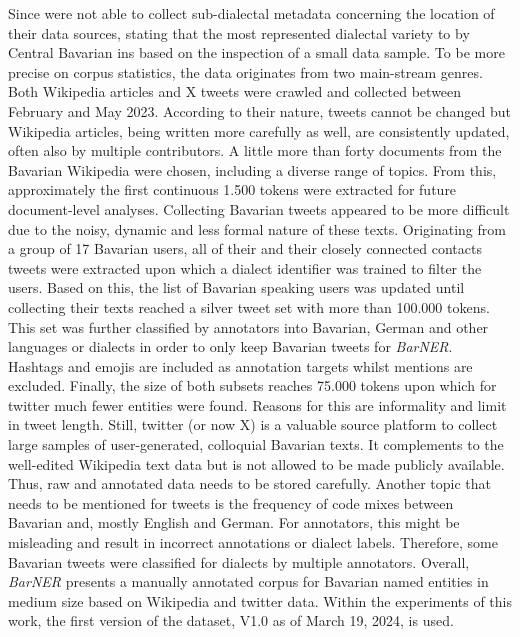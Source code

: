 \documentclass[11pt,a4paper,twoside,openright]{scrbook}
\begin{document}
Since \citet{peng-etal-2024-sebastian-basti} were not able to collect sub-dialectal metadata concerning the location of their data sources, stating that the most represented dialectal variety to by Central Bavarian ins based on the inspection of a small data sample. To be more precise on corpus statistics, the data originates from two main-stream genres. Both Wikipedia articles and X tweets were crawled and collected between February and May 2023. According to their nature, tweets cannot be changed but Wikipedia articles, being written more carefully as well, are consistently updated, often also by multiple contributors. A little more than forty documents from the Bavarian Wikipedia were chosen, including a diverse range of topics. From this, approximately the first continuous 1.500 tokens were extracted for future document-level analyses. Collecting Bavarian tweets appeared to be more difficult due to the noisy, dynamic and less formal nature of these texts. Originating from a group of 17 Bavarian users, all of their and their closely connected contacts tweets were extracted upon which a dialect identifier was trained to filter the users. Based on this, the list of Bavarian speaking users was updated until collecting their texts reached a silver tweet set with more than 100.000 tokens. This set was further classified by annotators into Bavarian, German and other languages or dialects in order to only keep Bavarian tweets for \textit{BarNER}. Hashtags and emojis are included as annotation targets whilst mentions are excluded. Finally, the size of both subsets reaches 75.000 tokens upon which for twitter much fewer entities were found. Reasons for this are informality and limit in tweet length. Still, twitter (or now X) is a valuable source platform to collect large samples of user-generated, colloquial Bavarian texts. It complements to the well-edited Wikipedia text data but is not allowed to be made publicly available. Thus, raw and annotated data needs to be stored carefully. Another topic that needs to be mentioned for tweets is the frequency of code mixes between Bavarian and, mostly English and German. For annotators, this might be misleading and result in incorrect annotations or dialect labels. Therefore, some Bavarian tweets were classified for dialects by multiple annotators. Overall, \textit{BarNER} \citep{peng-etal-2024-sebastian-basti} presents a manually annotated corpus for Bavarian named entities in medium size based on Wikipedia and twitter data. Within the experiments of this work, the first version of the dataset, V1.0 as of March 19, 2024, is used.
\end{document}
